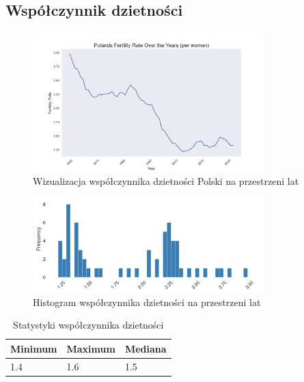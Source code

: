 \documentclass[11pt]{article}
\begin{document}
\subsection*{Współczynnik dzietności}
\begin{figure}[H]
        \centering
        \includegraphics[width=0.8\textwidth]{polish_fertility_rate.png}
        \caption{Wizualizacja współczynnika dzietności Polski na przestrzeni lat}
\end{figure}
\begin{figure}[H]
        \centering
        \includegraphics[width=0.8\textwidth]{images/histogram_dzietnosc.png}
        \caption{Histogram współczynnika dzietności na przestrzeni lat}
\end{figure}
\begin{table}[H]
        \centering
        \begin{tabular}{|l|l|l|}
        \hline
        Minimum & Maximum & Mediana \\ \hline
        1.4 & 1.6 & 1.5 \\ \hline
        \end{tabular}
        \caption{Statystyki współczynnika dzietności}
        \end{table}
\end{document}
